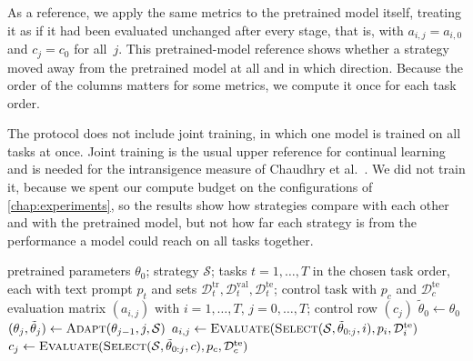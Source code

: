 As a reference, we apply the same metrics to the pretrained model itself, treating it as if it had been evaluated unchanged after every stage, that is, with $a_{i,j} = a_{i,0}$ and $c_j = c_0$ for all~$j$.
This pretrained-model reference shows whether a strategy moved away from the pretrained model at all and in which direction.
Because the order of the columns matters for some metrics, we compute it once for each task order.

The protocol does not include joint training, in which one model is trained on all tasks at once.
Joint training is the usual upper reference for continual learning and is needed for the intransigence measure of Chaudhry et al.~\cite{Chaudhry_2018}.
We did not train it, because we spent our compute budget on the configurations of \cref{chap:experiments}, so the results show how strategies compare with each other and with the pretrained model, but not how far each strategy is from the performance a model could reach on all tasks together.

\begin{algorithm}[tb]
\caption{Continual adaptation and evaluation protocol. \textsc{Adapt} adapts the model to one task (\cref{alg:adapt}); \textsc{Select} returns the parameters a strategy evaluates on a given task (the parameters of the stage for all strategies except task-specific LoRA, see text); \textsc{Evaluate} returns the mean \gls{dsc} over a test set.}
\label{alg:protocol}
\begin{algorithmic}[1]
\REQUIRE pretrained parameters $\theta_0$; strategy $\mathcal{S}$; tasks $t = 1, \dots, T$ in the chosen task order, each with text prompt $p_t$ and sets $\mathcal{D}_t^{\mathrm{tr}}, \mathcal{D}_t^{\mathrm{val}}, \mathcal{D}_t^{\mathrm{te}}$; control task with $p_c$ and $\mathcal{D}_c^{\mathrm{te}}$
\ENSURE evaluation matrix $(a_{i,j})$ with $i = 1, \dots, T$, $j = 0, \dots, T$; control row $(c_j)$
\STATE $\tilde{\theta}_0 \gets \theta_0$
    \STATE $(\theta_j, \tilde{\theta}_j) \gets \textsc{Adapt}(\theta_{j-1}, j, \mathcal{S})$ 
  \ENDIF
    \STATE $a_{i,j} \gets \textsc{Evaluate}(\textsc{Select}(\mathcal{S}, \tilde{\theta}_{0:j}, i), p_i, \mathcal{D}_i^{\mathrm{te}})$
  \ENDFOR
  \STATE $c_j \gets \textsc{Evaluate}(\textsc{Select}(\mathcal{S}, \tilde{\theta}_{0:j}, c), p_c, \mathcal{D}_c^{\mathrm{te}})$
\ENDFOR
\end{algorithmic}
\end{algorithm}

